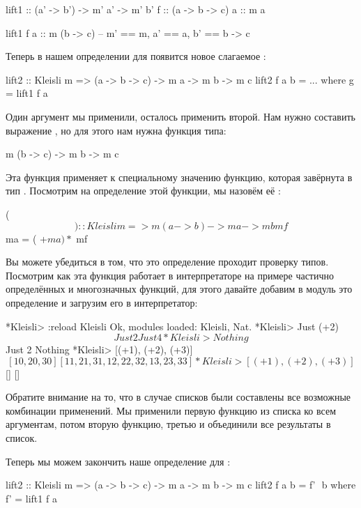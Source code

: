 \begin{code}
lift1       :: (a' -> b') -> m' a' -> m' b'
f           :: (a -> b -> c)
a           :: m a

lift1 f a   :: m (b -> c)  -- m' == m, a' == a, b' == b -> c
\end{code}

Теперь в нашем определении для  появится
новое слагаемое :

\begin{code}
lift2 :: Kleisli m => (a -> b -> c) -> m a -> m b -> m c
lift2 f a b = ...
    where g = lift1 f a
\end{code}

Один аргумент мы применили, осталось применить второй.
Нам нужно составить выражение , но 
для этого нам нужна функция типа:

\begin{code}
m (b -> c) -> m b -> m c
\end{code}

Эта функция применяет к специальному значению 
функцию, которая завёрнута в тип . 
Посмотрим на определение этой функции, мы назовём её
\In{$$}:

\begin{code}
($$) :: Kleisli m => m (a -> b) -> m a -> m b
mf $$ ma = ( +$ ma) *$ mf
\end{code}

Вы можете убедиться в том, что это определение проходит проверку типов.
Посмотрим как эта функция работает в интерпретаторе на примере
частично определённых и многозначных функций, для этого давайте
добавим в модуль  это определение и загрузим
его в интерпретатор:

\begin{code}
*Kleisli> :reload Kleisli
Ok, modules loaded: Kleisli, Nat.
*Kleisli> Just (+2) $$ Just 2
Just 4
*Kleisli> Nothing $$ Just 2
Nothing
*Kleisli> [(+1), (+2), (+3)] $$ [10,20,30]
[11,21,31,12,22,32,13,23,33]
*Kleisli> [(+1), (+2), (+3)] $$ []
[]
\end{code}

Обратите внимание на то, что в случае списков были составлены
все возможные комбинации применений. Мы применили первую функцию
из списка ко всем аргументам, потом вторую функцию, третью и объединили
все результаты в список.

Теперь мы можем закончить наше определение для :

\begin{code}
lift2 :: Kleisli m => (a -> b -> c) -> m a -> m b -> m c
lift2 f a b = f' $$ b
    where f' = lift1 f a
\end{code}

